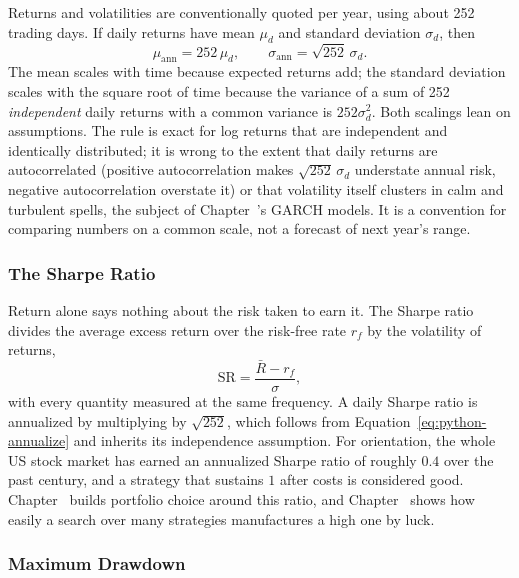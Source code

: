 \documentclass[../ai_in_finance]{subfiles}
\begin{document}
Returns and volatilities are conventionally quoted per year, using about 252 trading days. If daily returns have mean $\mu_d$ and standard deviation $\sigma_d$, then
\begin{equation}
\mu_{\text{ann}} = 252\,\mu_d, \qquad \sigma_{\text{ann}} = \sqrt{252}\,\sigma_d.\label{eq:python-annualize}
\end{equation}
The mean scales with time because expected returns add; the standard deviation scales with the square root of time because the variance of a sum of 252 \emph{independent} daily returns with a common variance is $252\sigma_d^2$. Both scalings lean on assumptions. The rule is exact for log returns that are independent and identically distributed; it is wrong to the extent that daily returns are autocorrelated (positive autocorrelation makes $\sqrt{252}\,\sigma_d$ understate annual risk, negative autocorrelation overstate it) or that volatility itself clusters in calm and turbulent spells, the subject of Chapter~'s GARCH models. It is a convention for comparing numbers on a common scale, not a forecast of next year's range.

\subsubsection*{The Sharpe Ratio}

Return alone says nothing about the risk taken to earn it. The Sharpe ratio divides the average excess return over the risk-free rate $r_f$ by the volatility of returns,
\begin{equation}
\text{SR} = \frac{\bar R - r_f}{\sigma},\label{eq:python-sharpe}
\end{equation}
with every quantity measured at the same frequency. A daily Sharpe ratio is annualized by multiplying by $\sqrt{252}$, which follows from Equation~\eqref{eq:python-annualize} and inherits its independence assumption. For orientation, the whole US stock market has earned an annualized Sharpe ratio of roughly $0.4$ over the past century, and a strategy that sustains $1$ after costs is considered good. Chapter~ builds portfolio choice around this ratio, and Chapter~ shows how easily a search over many strategies manufactures a high one by luck.

\subsubsection*{Maximum Drawdown}
\end{document}
